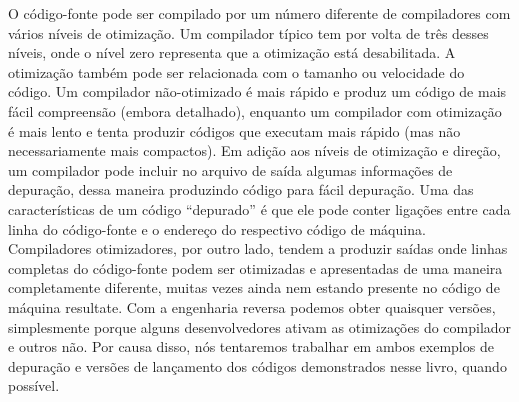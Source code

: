O código-fonte pode ser compilado por um número diferente de compiladores com vários níveis de otimização.
Um compilador típico tem por volta de três desses níveis, onde o nível zero representa que a otimização está desabilitada.
A otimização também pode ser relacionada com o tamanho ou velocidade do código.
Um compilador não-otimizado é mais rápido e produz um código de mais fácil compreensão (embora detalhado),
enquanto um compilador com otimização é mais lento e tenta produzir códigos que executam mais rápido (mas não necessariamente mais compactos).
Em adição aos níveis de otimização e  direção, um compilador pode incluir no arquivo de saída algumas informações de depuração, dessa maneira produzindo código para fácil depuração.
Uma das características de um código ``depurado'' é que ele pode conter ligações entre cada linha do código-fonte e o endereço do respectivo código de máquina.
Compiladores otimizadores, por outro lado, tendem a produzir saídas onde linhas completas do código-fonte podem ser otimizadas e apresentadas de uma maneira completamente diferente,
muitas vezes ainda nem estando presente no código de máquina resultate. Com a engenharia reversa podemos obter quaisquer versões,
simplesmente porque alguns desenvolvedores ativam as otimizações do compilador e outros não.
Por causa disso, nós tentaremos trabalhar em ambos exemplos de depuração e versões de lançamento dos códigos demonstrados nesse livro, quando possível.

\iffalse
\section*{Níveis de otimização e informação de depuração}

O código-fonte pode ser compilado por diferentes compiladores com vários níveis de otimização.
Um compilador típico tem cerca de três destes níveis, onde o nível zero significa desativar a otimização.
A otimização também pode ser direcionada para o tamanho do código ou para a velocidade do código.
Um compilador sem otimização é mais rápido e produz código mais inteligível (embora maior),
enquanto que um compilador com otimização é mais lento e tenta produzir um código que execute mais rápido (mas não é necessariamente mais compacto).
Além dos níveis e direcionamento da otimização, o compilador pode incluir no arquivo resultante algumas informações de depuração, produzindo assim código para fácil depuração.
Uma das características importantes do código de ´debug' é que ele pode conter 
ligações entre cada linha do código-fonte e os respectivos endereços de código de máquina.
Compiladores com otimização, por outro lado, tendem a produzir uma saída onde linhas inteiras de código-fonte podem ser otimizadas a ponto de serem removidas e portanto não estarem presentes no código de máquina resultante.
Engenheiros Reversos podem encontrar ambas as versões, simplesmente porque alguns desenvolvedores ativam as flags de otimização do compilador e outros não ativam. 
Por causa disso, nós tentaremos trabalhar em exemplos de ambas as versões de debug e release do código destacado neste livro, onde possível.
\fi
\fi %

